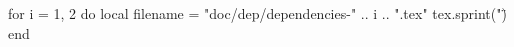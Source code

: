 \ifluatex
    \begin{luacode*}
        for i = 1, 2 do
            local filename = "doc/dep/dependencies-" .. i .. ".tex"
            tex.sprint("\")
        end
    \end{luacode*} 
\else
\fi